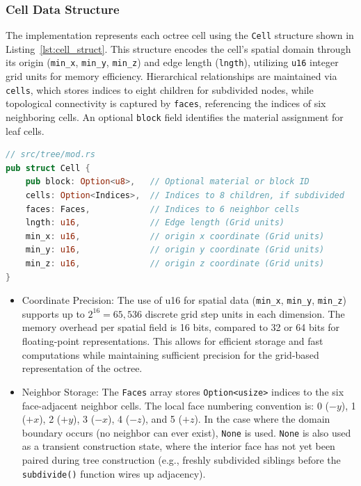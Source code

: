 \documentclass[review,12pt]{elsarticle}
\begin{document}
\subsubsection{Cell Data Structure}

The implementation represents each octree cell using the \texttt{Cell} structure shown in Listing~\ref{lst:cell_struct}. This structure encodes the cell's spatial domain through its origin (\texttt{min\_x}, \texttt{min\_y}, \texttt{min\_z}) and edge length (\texttt{lngth}), utilizing \texttt{u16} integer grid units for memory efficiency. Hierarchical relationships are maintained via \texttt{cells}, which stores indices to eight children for subdivided nodes, while topological connectivity is captured by \texttt{faces}, referencing the indices of six neighboring cells. An optional \texttt{block} field identifies the material assignment for leaf cells.


\begin{lstlisting}[language=Rust, caption={Rust implementation of the octree cell structure.}, label={lst:cell_struct}]
// src/tree/mod.rs
pub struct Cell {
    pub block: Option<u8>,   // Optional material or block ID
    cells: Option<Indices>,  // Indices to 8 children, if subdivided
    faces: Faces,            // Indices to 6 neighbor cells
    lngth: u16,              // Edge length (Grid units)
    min_x: u16,              // origin x coordinate (Grid units)
    min_y: u16,              // origin y coordinate (Grid units)
    min_z: u16,              // origin z coordinate (Grid units)
}
\end{lstlisting}

\begin{itemize}
\item Coordinate Precision: The use of u16 for spatial data (\texttt{min\_x}, \texttt{min\_y}, \texttt{min\_z}) supports up to $2^{16} = 65,536$ discrete grid step units in each dimension.  The memory overhead per spatial field is 16 bits, compared to 32 or 64 bits for floating-point representations. This allows for efficient storage and fast computations while maintaining sufficient precision for the grid-based representation of the octree.
\item Neighbor Storage: The \lstinline!Faces! array stores \lstinline!Option<usize>! indices to the six face-adjacent neighbor cells. The local face numbering convention is: 0 ($-y$), 1 ($+x$), 2 ($+y$), 3 ($-x$), 4 ($-z$), and 5 ($+z$). In the case where the domain boundary occurs (no neighbor can ever exist), \lstinline!None! is used. \lstinline!None! is also used as a transient construction state, where the interior face has not yet been paired during tree construction (e.g., freshly subdivided siblings before the \lstinline!subdivide()! function wires up adjacency).
\end{itemize}
\end{document}
